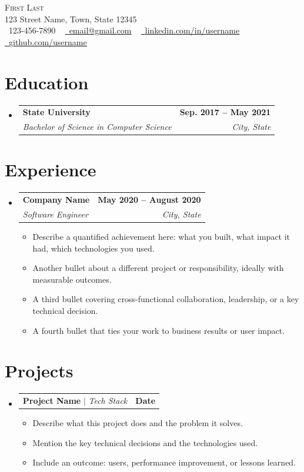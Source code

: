\documentclass[letterpaper,11pt]{article}
\makeatletter
\newcommand{\resumeItem}[1]{
  \item\small{
    {#1 \vspace{-2pt}}
  }
}
\newcommand{\resumeSubheading}[4]{
  \vspace{-2pt}\item
    \begin{tabular*}{1.0\textwidth}[t]{l@{\extracolsep{\fill}}r}
      \textbf{#1} & \textbf{\small #2} \\
      \textit{\small#3} & \textit{\small #4} \\
    \end{tabular*}\vspace{-7pt}
}
\newcommand{\resumeProjectHeading}[2]{
    \item
    \begin{tabular*}{1.001\textwidth}{l@{\extracolsep{\fill}}r}
      \small#1 & \textbf{\small #2}\\
    \end{tabular*}\vspace{-7pt}
}
\newcommand{\resumeSubHeadingListStart}{\begin{itemize}[leftmargin=0.0in, label={}]}
\newcommand{\resumeSubHeadingListEnd}{\end{itemize}}
\newcommand{\resumeItemListStart}{\begin{itemize}}
\newcommand{\resumeItemListEnd}{\end{itemize}\vspace{-5pt}}
\makeatother
\begin{document}
\begin{center}
    {\Huge \scshape First Last} \\ \vspace{1pt}
    123 Street Name, Town, State 12345 \\ \vspace{1pt}
    \small \raisebox{-0.1\height}\faPhone\ 123-456-7890 ~ \href{mailto:email@gmail.com}{\raisebox{-0.2\height}\faEnvelope\  \underline{email@gmail.com}} ~
    \href{https://linkedin.com/in/username}{\raisebox{-0.2\height}\faLinkedin\ \underline{linkedin.com/in/username}}  ~
    \href{https://github.com/username}{\raisebox{-0.2\height}\faGithub\ \underline{github.com/username}}
    \vspace{-8pt}
\end{center}


\section{Education}
  \resumeSubHeadingListStart
    \resumeSubheading
      {State University}{Sep. 2017 -- May 2021}
      {Bachelor of Science in Computer Science}{City, State}
  \resumeSubHeadingListEnd


\section{Experience}
  \resumeSubHeadingListStart

    \resumeSubheading
      {Company Name}{May 2020 -- August 2020}
      {Software Engineer}{City, State}
      \resumeItemListStart
        \resumeItem{Describe a quantified achievement here: what you built, what impact it had, which technologies you used.}
        \resumeItem{Another bullet about a different project or responsibility, ideally with measurable outcomes.}
        \resumeItem{A third bullet covering cross-functional collaboration, leadership, or a key technical decision.}
        \resumeItem{A fourth bullet that ties your work to business results or user impact.}
      \resumeItemListEnd

  \resumeSubHeadingListEnd
\vspace{-16pt}

\section{Projects}
    \vspace{-5pt}
    \resumeSubHeadingListStart
      \resumeProjectHeading
          {\textbf{Project Name} $|$ \emph{Tech Stack}}{Date}
          \resumeItemListStart
            \resumeItem{Describe what this project does and the problem it solves.}
            \resumeItem{Mention the key technical decisions and the technologies used.}
            \resumeItem{Include an outcome: users, performance improvement, or lessons learned.}
          \resumeItemListEnd
          \vspace{-13pt}
    \resumeSubHeadingListEnd
\vspace{-15pt}
\end{document}
